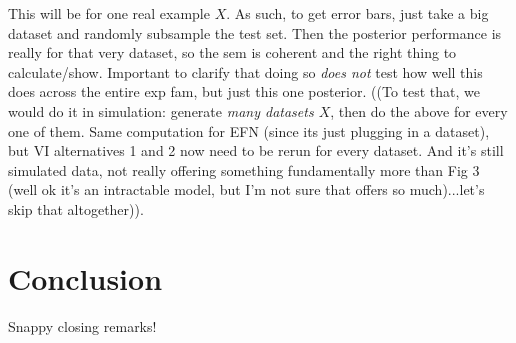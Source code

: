 \documentclass{article}
\begin{document}
This will be for one real example $X$.  As such, to get error bars, just take a big dataset and randomly subsample the test set.  Then the posterior performance is really for that very dataset, so the sem is coherent and the right thing to calculate/show.  Important to clarify that doing so \emph{does not} test how well this does across the entire exp fam, but just this one posterior.  ((To test that, we would do it in simulation: generate \emph{many datasets $X$}, then do the above for every one of them.  Same computation for EFN (since its just plugging in a dataset), but VI alternatives 1 and 2 now need to be rerun for every dataset.  And it's still simulated data, not really offering something fundamentally more than Fig 3 (well ok it's an intractable model, but I'm not sure that offers so much)...let's skip that altogether)).



\section{Conclusion}

Snappy closing remarks!

%


\clearpage



\end{document}
